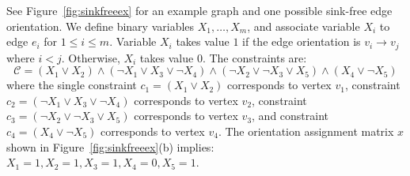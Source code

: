 {See Figure~\ref{fig:sinkfreeex} for an example graph and one possible sink-free edge orientation. We define binary variables $X_1,\ldots, X_m$, and associate variable $X_i$ to edge $e_i$ for $1\le i\le m$. Variable $X_i$ takes value $1$ if the edge orientation is $v_i\to v_j$ where $i<j$. Otherwise, $X_i$ takes value $0$. The constraints are:}
\begin{equation*}
\mathcal{C}=(X_1\vee X_2)\wedge(\neg X_1\vee X_3\vee\neg X_4)\wedge(\neg X_2\vee\neg X_3\vee X_5)\wedge(X_4\vee \neg X_5)
\end{equation*}
{where the single constraint  $c_1=(X_1\vee X_2)$ corresponds to vertex $v_1$, constraint $c_2=(\neg X_1\vee X_3\vee\neg X_4)$ corresponds to vertex  $v_2$, constraint $c_3=(\neg X_2\vee\neg X_3\vee X_5)$  corresponds to vertex  $v_3$, and constraint $c_4=(X_4\vee \neg X_5)$ corresponds to vertex  $v_4$. The orientation assignment matrix $x$ shown in Figure~\ref{fig:sinkfreeex}(b) implies: $X_1=1,X_2=1,X_3=1,X_4=0,X_5=1$.}

